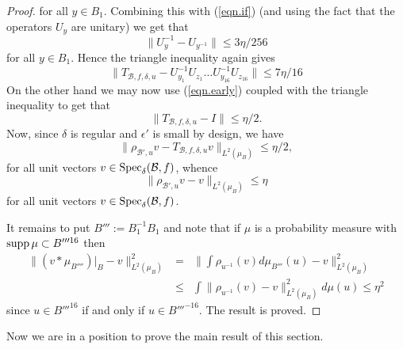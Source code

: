 \documentclass[12pt]{amsart}
\numberwithin{equation}{section}
\theoremstyle{plain}
\theoremstyle{definition}
\renewcommand{\leq}{\leqslant}
\providecommand{\supp}{\mathop{\rm supp}\nolimits}
\providecommand{\Spec}{\mathop{\rm Spec}\nolimits}
\begin{document}
\begin{proof}
for all $y \in B_1$. Combining this with (\ref{eqn.if}) (and using the fact that the operators $U_y$ are unitary) we get that
\begin{equation*}
\|U_y^{-1} -U_{y^{-1}}\| \leq 3\eta/256
\end{equation*}
for all $y \in B_1$.  Hence the triangle inequality again gives
\begin{equation*}
\|T_{\mathcal{B},f,\delta,u}-U_{y_1}^{-1}U_{z_1}\dots U_{y_{16}}^{-1}U_{z_{16}}\|\leq 7\eta/16
\end{equation*}
On the other hand we may now use (\ref{eqn.early}) coupled with the triangle inequality to get that
\begin{equation*}
\|T_{\mathcal{B},f,\delta,u}-I\| \leq \eta/2.
\end{equation*}
Now, since $\delta$ is regular and $\epsilon'$ is small by design, we have
\begin{equation*}
\|\rho_{\mathcal{B}',u}v-T_{\mathcal{B},f,\delta,u}v\|_{L^2(\mu_B)} \leq \eta/2,
\end{equation*}
for all unit vectors $v \in \Spec_\delta(\mathcal{B},f)$, whence
\begin{equation*}
\|\rho_{\mathcal{B}',u}v-v\|_{L^2(\mu_B)}\leq \eta
\end{equation*}
for all unit vectors $v \in \Spec_\delta(\mathcal{B},f)$.

It remains to put $B''':=B_1^{-1}B_1$ and note that if $\mu$ is a probability measure with $\supp \mu \subset B'''^{16}$ then
\begin{eqnarray*}
\|(v \ast \mu_{B''''})|_B-v\|_{L^2(\mu_B)}^2& =& \|\int{\rho_{u^{-1}}(v)d\mu_{B'''}(u)}-v\|_{L^2(\mu_B)}^2\\ & \leq & \int{\|\rho_{u^{-1}}(v) -v\|_{L^2(\mu_B)}^2d\mu(u)}\leq \eta^2
\end{eqnarray*}
since $u \in B'''^{16}$ if and only if $u \in B'''^{-16}$.  The result is proved.
\end{proof}
Now we are in a position to prove the main result of this section.
\end{document}
